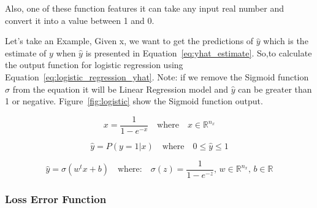 Also, one of these function features it can take any input real number and convert it into a value between 1 and 0.



Let's take an Example, Given x, we want to get the predictions of $\widehat{y}$ which is the estimate of $y$  when $\widehat{y}$  is presented in Equation~\eqref{eq:yhat_estimate}. So,to calculate the output function for logistic regression using Equation~\eqref{eq:logistic_regression_yhat}. Note: if we remove the Sigmoid function $\sigma$ from the equation it will be Linear Regression model and $\widehat{y}$ can be greater than 1 or negative. Figure~\ref{fig:logistic} show the Sigmoid function output. 

\begin{equation}\label{eq:logistic_function}
  x = \frac{1}{1-e^{-x}} \quad \text{where} \quad x \in \mathbb{R}^{n_x} 
\end{equation}

\begin{equation}
  \label{eq:yhat_estimate}
    \widehat{y} = P(y=1 | x) \quad \text{where}  \quad 0 \le \widehat{y}  \le 1
  \end{equation}

\begin{equation}
  \label{eq:logistic_regression_yhat}
  \widehat{y} = \sigma(w^t x + b)  \quad \text{where:} \quad  \sigma(z) = \frac{1}{1-e^{-z}} \text{, }  w \in  \mathbb{R}^{n_x} \text{, }  b \in  \mathbb{R}  
\end{equation}


\subsubsection{Loss Error Function}

